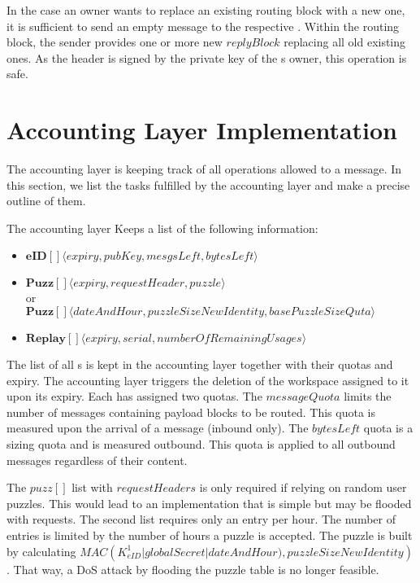 In the case an owner wants to replace an existing routing block with a new one, it is sufficient to send an empty message to the respective . Within the routing block, the sender provides one or more new $replyBlock$ replacing all old existing ones. As the header is signed by the private key of the s owner, this operation is safe.

\chapter{Accounting Layer Implementation}\label{sec:accountingImplementation}
The accounting layer is keeping track of all operations allowed to a message. In this section, we list the tasks fulfilled by the accounting layer and make a precise outline of them.

The accounting layer Keeps a list of the following information:
\begin{itemize}
	\item $\mathbf{eID[]}\langle expiry, pubKey, mesgsLeft, bytesLeft \rangle$\\
	\item $\mathbf{Puzz[]}\langle expiry, requestHeader, puzzle \rangle$\\
	or\\
	$\mathbf{Puzz[]}\langle dateAndHour, puzzleSizeNewIdentity, basePuzzleSizeQuta \rangle$\\
	\item $\mathbf{Replay[]}\langle expiry, serial, numberOfRemainingUsages \rangle$\\
\end{itemize}

The list of all s is kept in the accounting layer together with their quotas and expiry. The accounting layer triggers the deletion of the workspace assigned to it upon its expiry. Each  has assigned two quotas. The $messageQuota$ limits the number of messages containing payload blocks to be routed. This quota is measured upon the arrival of a message (inbound only). The $bytesLeft$ quota is a sizing quota and is measured outbound. This quota is applied to all outbound messages regardless of their content.

The $puzz[]$ list with $requestHeaders$ is only required if relying on random user puzzles. This would lead to an implementation that is simple but may be flooded with  requests. The second list requires only an entry per hour. The number of entries is limited by the number of hours a puzzle is accepted. The puzzle is built by calculating  $MAC\left(K^1_{eID} | globalSecret | dateAndHour ), puzzleSizeNewIdentity\right)$. That way, a DoS attack by flooding the puzzle table is no longer feasible.

